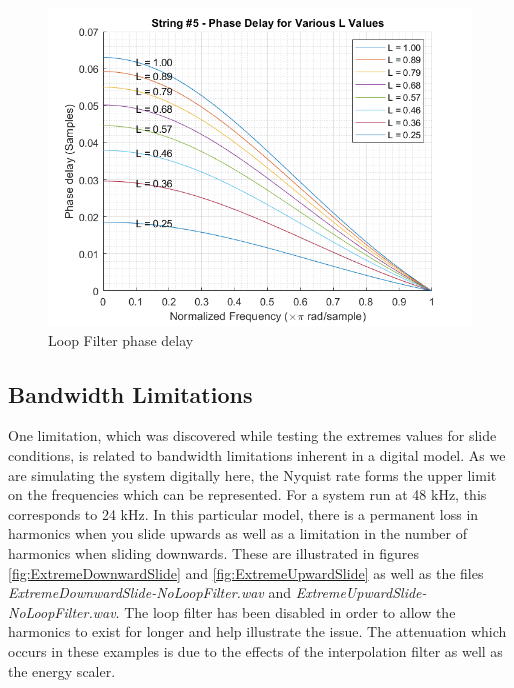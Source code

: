 \documentclass[../main.tex]{subfiles}
\begin{document}
\begin{figure}[h]
    \centering
    \includegraphics[scale=.65]{./images/plots/String 5 - Phase Delays.png}
    \caption{Loop Filter phase delay}
    \label{fig:Str5PhaseDelays}
\end{figure}

\subsection{Bandwidth Limitations}
One limitation, which was discovered while testing the extremes values for slide conditions, is related to bandwidth limitations inherent in a digital model. As we are simulating the system digitally here, the Nyquist rate forms the upper limit on the frequencies which can be represented. For a system run at 48 kHz, this corresponds to 24 kHz. In this particular model, there is a permanent loss in harmonics when you slide upwards as well as a limitation in the number of harmonics when sliding downwards. These are illustrated in figures \ref{fig:ExtremeDownwardSlide} and \ref{fig:ExtremeUpwardSlide} as well as the files \emph{ExtremeDownwardSlide-NoLoopFilter.wav} and \emph{ExtremeUpwardSlide-NoLoopFilter.wav}. The loop filter has been disabled in order to allow the harmonics to exist for longer and help illustrate the issue. The attenuation which occurs in these examples is due to the effects of the interpolation filter as well as the energy scaler.
\end{document}
